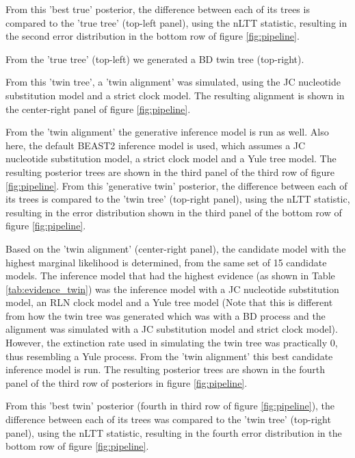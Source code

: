 From this 'best true' posterior, the difference between each of its trees is
compared to the 'true tree' (top-left panel), using the nLTT statistic,
resulting in the second error distribution in the bottom row
of figure \ref{fig:pipeline}.

From the 'true tree' (top-left) we generated a BD twin tree (top-right).

From this 'twin tree', a 'twin alignment' was simulated, using
the JC nucleotide substitution model and a strict clock model.
The resulting alignment is shown in the center-right panel
of figure \ref{fig:pipeline}.

From the 'twin alignment' the generative inference model is run as well.
Also here, the default BEAST2 inference model is used, 
which assumes a JC nucleotide
substitution model, a strict clock model and a Yule tree model.
The resulting posterior trees are shown in the
third panel of the third row of figure \ref{fig:pipeline}.
From this 'generative twin' posterior, 
the difference between each of its trees is
compared to the 'twin tree' (top-right panel), using the nLTT statistic,
resulting in the error distribution shown in the third panel
of the bottom row of figure \ref{fig:pipeline}.

Based on the 'twin alignment' (center-right panel), the candidate model
with the highest marginal likelihood is determined, from the same 
set of 15 candidate models. The inference model that had the
highest evidence (as shown in Table \ref{tab:evidence_twin}) was 
the inference model with a JC nucleotide substitution model,
an RLN clock model and a Yule tree model 
(Note that this is different from how the twin tree was generated which was with a BD process and the alignment
was simulated with a JC substitution model and strict clock model). 
However, the extinction rate used in simulating the twin tree was practically 0, thus resembling a Yule process.
From the 'twin alignment' this best candidate inference model is run.
The resulting posterior trees are shown in the fourth panel
of the third row of posteriors in figure \ref{fig:pipeline}.

From this 'best twin' posterior (fourth in third row of
figure \ref{fig:pipeline}), the difference between each of its trees was
compared to the 'twin tree' (top-right panel), using the nLTT statistic,
resulting in the fourth error distribution in the bottom row
of figure \ref{fig:pipeline}.

